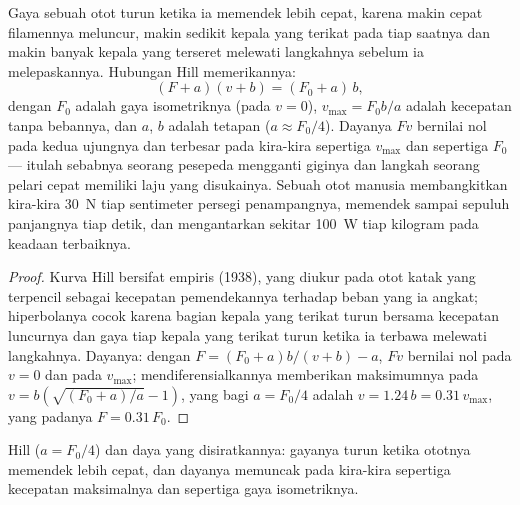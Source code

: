 \begin{theorem}\label{thm:b2:muscle-movement:hill}
Gaya sebuah otot turun ketika ia memendek lebih cepat, karena makin
cepat filamennya meluncur, makin sedikit kepala yang terikat pada tiap
saatnya dan makin banyak kepala yang terseret melewati langkahnya
sebelum ia melepaskannya. Hubungan Hill memerikannya:
\[
(F + a)(v + b) = (F_0 + a)\,b,
\]
dengan $F_0$ adalah gaya isometriknya (pada $v = 0$), $v_{\max} =
F_0 b/a$ adalah kecepatan tanpa bebannya, dan $a$, $b$ adalah tetapan
($a \approx
F_0/4$). Dayanya $Fv$ bernilai nol pada kedua ujungnya dan
terbesar pada kira-kira sepertiga $v_{\max}$ dan sepertiga $F_0$ ---
itulah sebabnya seorang pesepeda mengganti giginya dan langkah seorang
pelari cepat memiliki laju yang disukainya. Sebuah otot manusia
membangkitkan kira-kira \qty{30}{N} tiap sentimeter persegi
penampangnya, memendek sampai sepuluh panjangnya tiap detik, dan
mengantarkan sekitar \qty{100}{W} tiap kilogram pada keadaan terbaiknya.
\end{theorem}
\begin{proof}
Kurva Hill bersifat empiris (1938), yang diukur pada otot katak yang
terpencil sebagai kecepatan pemendekannya terhadap beban yang ia
angkat; hiperbolanya cocok karena bagian kepala yang terikat turun
bersama kecepatan luncurnya dan gaya tiap kepala yang terikat turun
ketika ia terbawa melewati langkahnya. Dayanya: dengan $F = (F_0 + a)b/(v + b) - a$, $Fv$ bernilai nol pada $v = 0$ dan pada $v_{\max}$;
mendiferensialkannya memberikan maksimumnya pada
$v = b(\sqrt{(F_0 + a)/a} - 1)$, yang bagi $a = F_0/4$ adalah $v =
1.24\,b = 0.31\,v_{\max}$, yang padanya $F = 0.31\,F_0$.
\end{proof}

\begin{omfigure}

{\small {} Hill ($a = F_0/4$) dan daya yang
disiratkannya: gayanya turun ketika ototnya memendek lebih cepat, dan
dayanya memuncak pada kira-kira sepertiga kecepatan maksimalnya dan
sepertiga gaya isometriknya.}
\end{omfigure}

